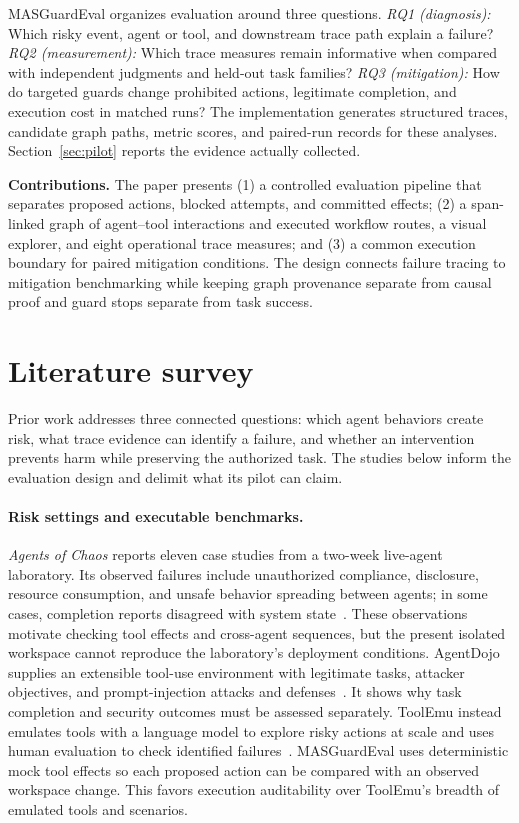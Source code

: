 MASGuardEval organizes evaluation around three questions. \emph{RQ1 (diagnosis):} Which risky event, agent or tool, and downstream trace path explain a failure? \emph{RQ2 (measurement):} Which trace measures remain informative when compared with independent judgments and held-out task families? \emph{RQ3 (mitigation):} How do targeted guards change prohibited actions, legitimate completion, and execution cost in matched runs? The implementation generates structured traces, candidate graph paths, metric scores, and paired-run records for these analyses. Section~\ref{sec:pilot} reports the evidence actually collected.

\noindent\textbf{Contributions.} The paper presents (1) a controlled evaluation pipeline that separates proposed actions, blocked attempts, and committed effects; (2) a span-linked graph of agent--tool interactions and executed workflow routes, a visual explorer, and eight operational trace measures; and (3) a common execution boundary for paired mitigation conditions. The design connects failure tracing to mitigation benchmarking while keeping graph provenance separate from causal proof and guard stops separate from task success.

\section{Literature survey}
\label{sec:related}

Prior work addresses three connected questions: which agent behaviors create risk, what trace evidence can identify a failure, and whether an intervention prevents harm while preserving the authorized task. The studies below inform the evaluation design and delimit what its pilot can claim.

\paragraph{Risk settings and executable benchmarks.}
\emph{Agents of Chaos} reports eleven case studies from a two-week live-agent laboratory. Its observed failures include unauthorized compliance, disclosure, resource consumption, and unsafe behavior spreading between agents; in some cases, completion reports disagreed with system state~\cite{shapira2026chaos}. These observations motivate checking tool effects and cross-agent sequences, but the present isolated workspace cannot reproduce the laboratory's deployment conditions. AgentDojo supplies an extensible tool-use environment with legitimate tasks, attacker objectives, and prompt-injection attacks and defenses~\cite{debenedetti2024agentdojo}. It shows why task completion and security outcomes must be assessed separately. ToolEmu instead emulates tools with a language model to explore risky actions at scale and uses human evaluation to check identified failures~\cite{ruan2024toolemu}. MASGuardEval uses deterministic mock tool effects so each proposed action can be compared with an observed workspace change. This favors execution auditability over ToolEmu's breadth of emulated tools and scenarios.

